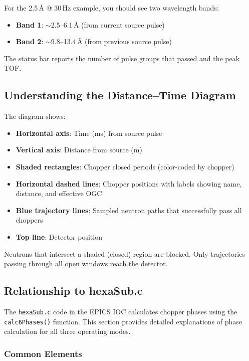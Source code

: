 \documentclass[11pt,letterpaper]{article}
\begin{document}
For the 2.5\,\AA{} @ 30\,Hz example, you should see two wavelength bands:
\begin{itemize}
    \item \textbf{Band 1}: $\sim$2.5--6.1\,\AA{} (from current source pulse)
    \item \textbf{Band 2}: $\sim$9.8--13.4\,\AA{} (from previous source pulse)
\end{itemize}

The status bar reports the number of pulse groups that passed and the peak TOF.

\subsection{Understanding the Distance--Time Diagram}

The diagram shows:
\begin{itemize}
    \item \textbf{Horizontal axis}: Time (ms) from source pulse
    \item \textbf{Vertical axis}: Distance from source (m)
    \item \textbf{Shaded rectangles}: Chopper closed periods (color-coded by chopper)
    \item \textbf{Horizontal dashed lines}: Chopper positions with labels showing name, distance, 
    and effective OGC
    \item \textbf{Blue trajectory lines}: Sampled neutron paths that successfully pass all choppers
    \item \textbf{Top line}: Detector position
\end{itemize}

Neutrons that intersect a shaded (closed) region are blocked. Only trajectories passing through 
all open windows reach the detector.

\subsection{Relationship to hexaSub.c}

The \texttt{hexaSub.c} code in the EPICS IOC calculates chopper phases using the \texttt{calc6Phases()} 
function. This section provides detailed explanations of phase calculation for all three operating modes.

\subsubsection{Common Elements}
\end{document}
